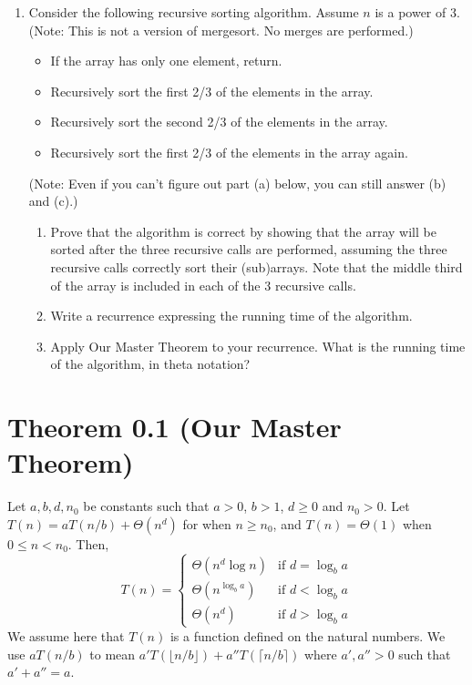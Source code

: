 \documentclass{article}
\begin{document}
\begin{enumerate}
    \item Consider the following recursive sorting algorithm. Assume $n$ is a power of 3. (Note: This is not a version of mergesort. No merges are performed.)
    \begin{itemize}
        \item If the array has only one element, return.
        \item Recursively sort the first 2/3 of the elements in the array.
        \item Recursively sort the second 2/3 of the elements in the array.
        \item Recursively sort the first 2/3 of the elements in the array again.
    \end{itemize}
    (Note: Even if you can’t figure out part (a) below, you can still answer (b) and (c).)
    \begin{enumerate}
        \item Prove that the algorithm is correct by showing that the array will be sorted after the three recursive calls are performed, assuming the three recursive calls correctly sort their (sub)arrays. Note that the middle third of the array is included in each of the 3 recursive calls.
        \item Write a recurrence expressing the running time of the algorithm.
        \item Apply Our Master Theorem to your recurrence. What is the running time of the algorithm, in theta notation?
    \end{enumerate}
\end{enumerate}

\section*{Theorem 0.1 (Our Master Theorem)}
Let $a, b, d, n_0$ be constants such that $a > 0$, $b > 1$, $d \geq 0$ and $n_0 > 0$.
Let $T(n) = aT(n/b) + \Theta(n^d)$ for when $n \geq n_0$, and $T(n) = \Theta(1)$ when $0 \leq n < n_0$. Then,
\[
T(n) = \begin{cases}
    \Theta(n^d \log n) & \text{if } d = \log_b a \\
    \Theta(n^{\log_b a}) & \text{if } d < \log_b a \\
    \Theta(n^d) & \text{if } d > \log_b a
\end{cases}
\]
We assume here that $T(n)$ is a function defined on the natural numbers. We use $aT(n/b)$ to mean $a'T(\lfloor n/b \rfloor) + a''T(\lceil n/b \rceil)$ where $a', a'' > 0$ such that $a' + a'' = a$.
\end{document}

